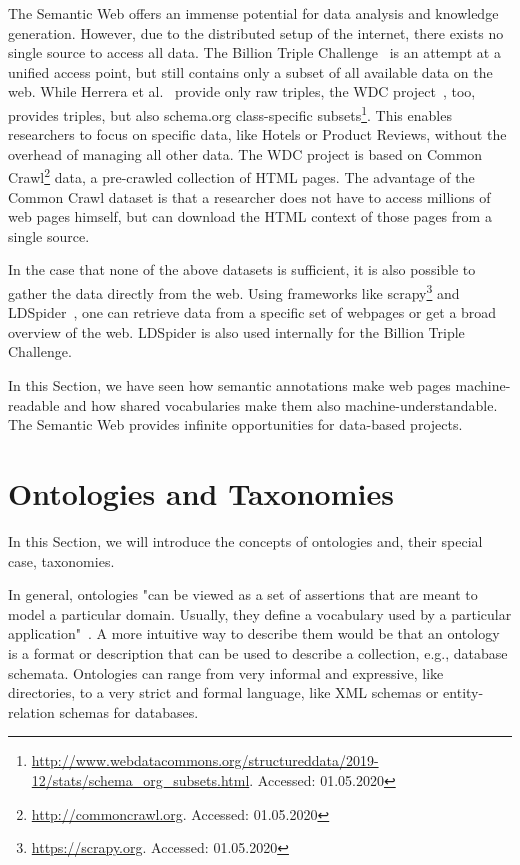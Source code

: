 The Semantic Web offers an immense potential for data analysis and knowledge generation.
However, due to the distributed setup of the internet, there exists no single source to access all data.
The Billion Triple Challenge~\cite{herrera2019btc} is an attempt at a unified access point, but still contains
only a subset of all available data on the web.
While Herrera et al.\@~\cite{herrera2019btc} provide only raw triples, the WDC
project~\cite{meusel2014webdatacommons}, too, provides triples, but also schema.org class-specific
subsets\footnote{\url{http://www.webdatacommons.org/structureddata/2019-12/stats/schema_org_subsets.html}. Accessed: 01.05.2020}.
This enables researchers to focus on specific data, like Hotels or Product Reviews, without the overhead
of managing all other data.
The WDC project is based on Common Crawl\footnote{\url{http://commoncrawl.org}. Accessed: 01.05.2020} data, a pre-crawled
collection of HTML pages.
The advantage of the Common Crawl dataset is that a researcher does not have to access millions of web pages himself,
but can download the HTML context of those pages from a single source.

In the case that none of the above datasets is sufficient, it is also possible to gather the data directly from the web.
Using frameworks like scrapy\footnote{\url{https://scrapy.org}. Accessed: 01.05.2020} and LDSpider~\cite{isele2010ldspider},
one can retrieve data from a specific set of webpages or get a broad overview of the web.
LDSpider is also used internally for the Billion Triple Challenge.

In this Section, we have seen how semantic annotations make web pages machine-readable and how
shared vocabularies make them also machine-understandable.
The Semantic Web provides infinite opportunities for data-based projects.

\section{Ontologies and Taxonomies}
\label{sec:onto-taxo}

In this Section, we will introduce the concepts of ontologies and, their special case, taxonomies.

In general, ontologies "can be viewed as  a set of  assertions that are meant to model a
particular domain.
Usually, they define a vocabulary used by a particular application"~\cite[p. 25]{euzenat2007ontology}.
A more intuitive way to describe them would be that an ontology is a format or description
that can be used to describe a collection, e.g., database schemata.
Ontologies can range from very informal and expressive, like directories, to a very strict and
formal language, like XML schemas or entity-relation schemas for databases.

